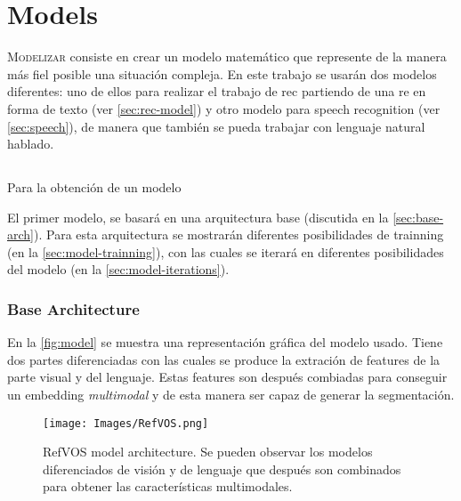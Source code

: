 

\chapter{Models} \label{cha:model}



\lettrine{M}{odelizar} consiste en crear un modelo matemático que represente de
la manera más fiel posible una situación compleja. En este trabajo se usarán
dos modelos diferentes: uno de ellos para realizar el trabajo de \gls{rec}
partiendo de una \gls{re} en forma de texto (ver \vref{sec:rec-model}) y otro
modelo para speech recognition (ver \vref{sec:speech}), de manera que también
se pueda trabajar con lenguaje natural hablado.


\section{} \label{sec:rec-model}

Para la obtención de un modelo

El primer modelo, se basará en una arquitectura base (discutida en la
\vref{sec:base-arch}). Para esta arquitectura se mostrarán diferentes
posibilidades de trainning (en la \vref{sec:model-trainning}), con las
cuales se iterará en diferentes posibilidades del modelo (en la
\vref{sec:model-iterations}).

\subsection{Base Architecture} \label{sec:base-arch}

En la \vref{fig:model} se muestra una representación gráfica del modelo
usado. Tiene dos partes diferenciadas con las cuales se produce la extración de
features de la parte visual y del lenguaje. Estas features son después
combiadas para conseguir un embedding \emph{multimodal} y de esta manera ser
capaz de generar la segmentación.

\begin{figure}[htb]
  \centering
  \texttt{[image: Images/RefVOS.png]}
  \caption[RefVOS model architecture]{RefVOS model architecture. Se pueden
    observar los modelos diferenciados de visión y de lenguaje que después son
    combinados para obtener las características multimodales.}
  \label{fig:model}
\end{figure}

